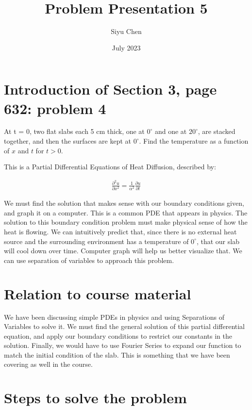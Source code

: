 \documentclass{article}
\title{Problem Presentation 5}
\author{Siyu Chen}
\date{July 2023}
\numberwithin{equation}{section}
\begin{document}
\maketitle

\section{Introduction of Section 3, page 632: problem 4}

At t = 0, two flat slabs each 5 cm thick, one at $0^\circ$ and one at $20^\circ$, are stacked together, and then the surfaces are kept at $0^\circ$. Find the temperature as a function of $x$ and $t$ for $t > 0$.

This is a Partial Differential Equations of Heat Diffusion, described by:

\begin{align}
    \frac{\partial^2 u}{\partial x^2} = \frac{1}{\alpha^2} \frac{\partial u}{\partial t}
\end{align}

We must find the solution that makes sense with our boundary conditions given, and graph it on a computer. This is a common PDE that appears in physics. The solution to this boundary condition problem must make physical sense of how the heat is flowing. We can intuitively predict that, since there is no external heat source and the surrounding environment has a temperature of $0^\circ$, that our slab will cool down over time. Computer graph will help us better visualize that. We can use separation of variables to approach this problem.

\section{Relation to course material}

We have been discussing simple PDEs in physics and using Separations of Variables to solve it. We must find the general solution of this partial differential equation, and apply our boundary conditions to restrict our constants in the solution. Finally, we would have to use Fourier Series to expand our function to match the initial condition of the slab. This is something that we have been covering as well in the course.

\section{Steps to solve the problem }
\end{document}
